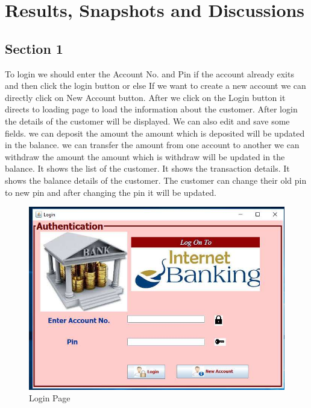 \chapter{Results, Snapshots and Discussions}

\section{Section 1}
To login we should enter the Account No. and Pin if the account already exits and then click
the login button or else If we want to create a new account we can directly click on New
Account button. After we click on the Login button it directs to loading page to load the
information about the customer. After login the details of the customer will be displayed. We
can also edit and save some fields. we can deposit the amount the amount which is deposited
will be updated in the balance. we can transfer the amount from one account to another we
can withdraw the amount the amount which is withdraw will be updated in the balance. It
shows the list of the customer. It shows the transaction details. It shows the balance details of
the customer. The customer can change their old pin to new pin and after changing the pin it
will be updated.\\[0.2in]
\begin{figure}[H]
\centering
\includegraphics[scale=.5]{./loginPage.png}
\caption{Login Page}
\label{fig:Login Page}
\end{figure}

